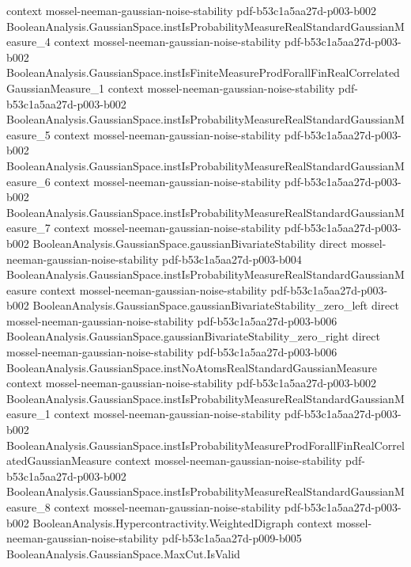 \begin{theorem}
  {context}
  {mossel-neeman-gaussian-noise-stability}
  {pdf-b53c1a5aa27d-p003-b002}
\proofstep
  {BooleanAnalysis.GaussianSpace.instIsProbabilityMeasureRealStandardGaussianMeasure_4}
  {context}
  {mossel-neeman-gaussian-noise-stability}
  {pdf-b53c1a5aa27d-p003-b002}
\proofstep
  {BooleanAnalysis.GaussianSpace.instIsFiniteMeasureProdForallFinRealCorrelatedGaussianMeasure_1}
  {context}
  {mossel-neeman-gaussian-noise-stability}
  {pdf-b53c1a5aa27d-p003-b002}
\proofstep
  {BooleanAnalysis.GaussianSpace.instIsProbabilityMeasureRealStandardGaussianMeasure_5}
  {context}
  {mossel-neeman-gaussian-noise-stability}
  {pdf-b53c1a5aa27d-p003-b002}
\proofstep
  {BooleanAnalysis.GaussianSpace.instIsProbabilityMeasureRealStandardGaussianMeasure_6}
  {context}
  {mossel-neeman-gaussian-noise-stability}
  {pdf-b53c1a5aa27d-p003-b002}
\proofstep
  {BooleanAnalysis.GaussianSpace.instIsProbabilityMeasureRealStandardGaussianMeasure_7}
  {context}
  {mossel-neeman-gaussian-noise-stability}
  {pdf-b53c1a5aa27d-p003-b002}
\proofstep
  {BooleanAnalysis.GaussianSpace.gaussianBivariateStability}
  {direct}
  {mossel-neeman-gaussian-noise-stability}
  {pdf-b53c1a5aa27d-p003-b004}
\proofstep
  {BooleanAnalysis.GaussianSpace.instIsProbabilityMeasureRealStandardGaussianMeasure}
  {context}
  {mossel-neeman-gaussian-noise-stability}
  {pdf-b53c1a5aa27d-p003-b002}
\proofstep
  {BooleanAnalysis.GaussianSpace.gaussianBivariateStability_zero_left}
  {direct}
  {mossel-neeman-gaussian-noise-stability}
  {pdf-b53c1a5aa27d-p003-b006}
\proofstep
  {BooleanAnalysis.GaussianSpace.gaussianBivariateStability_zero_right}
  {direct}
  {mossel-neeman-gaussian-noise-stability}
  {pdf-b53c1a5aa27d-p003-b006}
\proofstep
  {BooleanAnalysis.GaussianSpace.instNoAtomsRealStandardGaussianMeasure}
  {context}
  {mossel-neeman-gaussian-noise-stability}
  {pdf-b53c1a5aa27d-p003-b002}
\proofstep
  {BooleanAnalysis.GaussianSpace.instIsProbabilityMeasureRealStandardGaussianMeasure_1}
  {context}
  {mossel-neeman-gaussian-noise-stability}
  {pdf-b53c1a5aa27d-p003-b002}
\proofstep
  {BooleanAnalysis.GaussianSpace.instIsProbabilityMeasureProdForallFinRealCorrelatedGaussianMeasure}
  {context}
  {mossel-neeman-gaussian-noise-stability}
  {pdf-b53c1a5aa27d-p003-b002}
\proofstep
  {BooleanAnalysis.GaussianSpace.instIsProbabilityMeasureRealStandardGaussianMeasure_8}
  {context}
  {mossel-neeman-gaussian-noise-stability}
  {pdf-b53c1a5aa27d-p003-b002}
\proofstep
  {BooleanAnalysis.Hypercontractivity.WeightedDigraph}
  {context}
  {mossel-neeman-gaussian-noise-stability}
  {pdf-b53c1a5aa27d-p009-b005}
\proofstep
  {BooleanAnalysis.GaussianSpace.MaxCut.IsValid}

\end{theorem}
